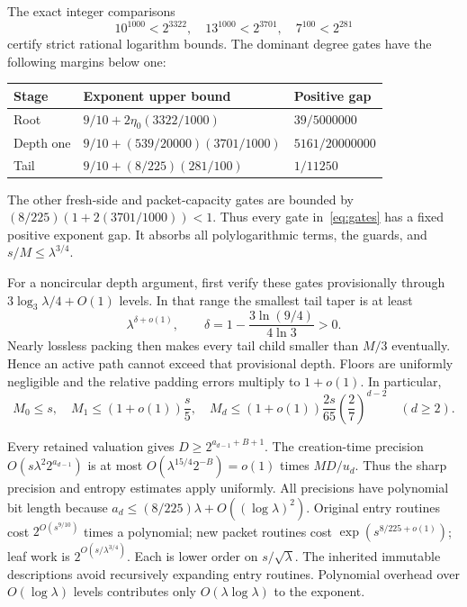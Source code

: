The exact integer comparisons
\[
 10^{1000}<2^{3322},\quad13^{1000}<2^{3701},\quad7^{100}<2^{281}
\]
certify strict rational logarithm bounds. The dominant degree gates have
the following margins below one:
\begin{center}
\begin{tabular}{lll}
\toprule Stage & Exponent upper bound & Positive gap\\\midrule
Root &$9/10+2\eta_0(3322/1000)$ &$39/5000000$\\
Depth one &$9/10+(539/20000)(3701/1000)$ &$5161/20000000$\\
Tail &$9/10+(8/225)(281/100)$ &$1/11250$\\
\bottomrule
\end{tabular}\end{center}
The other fresh-side and packet-capacity gates are bounded by
$(8/225)(1+2(3701/1000))<1$. Thus every gate in~\eqref{eq:gates}
has a fixed positive exponent gap. It absorbs all polylogarithmic terms,
the guards, and $s/M\le\lambda^{3/4}$.

For a noncircular depth argument, first verify these gates provisionally
through $3\log_3\lambda/4+O(1)$ levels. In that range the smallest tail
taper is at least
\[
 \lambda^{\delta+o(1)},\qquad
 \delta=1-\frac{3\ln(9/4)}{4\ln3}>0.
\]
Nearly lossless packing then makes every tail child smaller than $M/3$
eventually. Hence an active path cannot exceed that provisional depth.
Floors are uniformly negligible and the relative padding errors multiply
to $1+o(1)$. In particular,
\begin{equation}\label{eq:masses}
 M_0\le s,\quad M_1\le(1+o(1))\frac s5,\quad
 M_d\le(1+o(1))\frac{2s}{65}\left(\frac27\right)^{d-2}\quad(d\ge2).
\end{equation}

Every retained valuation gives
$D\ge2^{a_{d-1}+B+1}$. The creation-time precision
$O(s\lambda^2 2^{a_{d-1}})$ is at most
$O(\lambda^{15/4}2^{-B})=o(1)$ times $MD/u_d$. Thus the sharp
precision and entropy estimates apply uniformly. All precisions have
polynomial bit length because $a_d\le(8/225)\lambda+O((\log\lambda)^2)$.
Original entry routines cost $2^{O(s^{9/10})}$ times a polynomial;
new packet routines cost $\exp(s^{8/225+o(1)})$; leaf work is
$2^{O(s/\lambda^{3/4})}$. Each is lower order on $s/\sqrt\lambda$.
The inherited immutable descriptions avoid recursively expanding entry
routines. Polynomial overhead over $O(\log\lambda)$ levels contributes
only $O(\lambda\log\lambda)$ to the exponent.

